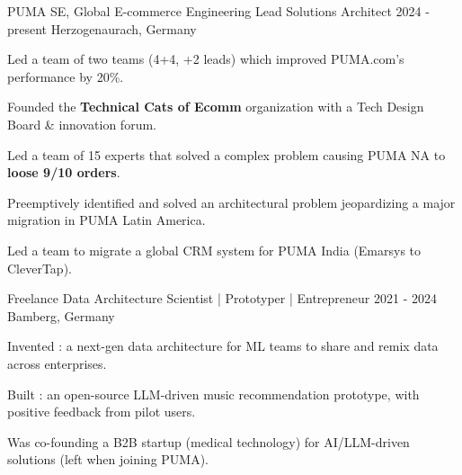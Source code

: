 {}

\vspace{2ex}

\begin{cventries}






    
        
  \cventry
    {PUMA SE, Global E-commerce Engineering}  %
    {Lead Solutions Architect} %
    {2024 - present} %
    {Herzogenaurach, Germany} %
    {
      \begin{cvitems} %
		\item {Led a team of two teams (4+4, +2 leads) which improved PUMA.com's performance by 20\%.}
		\item {Founded the \textbf{Technical Cats of Ecomm} organization with a Tech Design Board \& innovation forum.}
		\item {Led a team of 15 experts that solved a complex problem causing PUMA NA to \textbf{loose 9/10 orders}.}
		\item {Preemptively identified and solved an architectural problem jeopardizing a major migration in PUMA Latin America.}
		\item {Led a team to migrate a global CRM system for PUMA India (Emarsys to CleverTap).}
    \end{cvitems}
    }
    
\vspace{4ex}



    
        
  \cventry
    {Freelance}   %
    {Data Architecture Scientist | Prototyper | Entrepreneur} %
    {2021 - 2024} %
    {Bamberg, Germany} %
    {
      \begin{cvitems} %
		\item {Invented : a next-gen data architecture for ML teams to share and remix data across enterprises.}			
		\item {Built : an open-source LLM-driven music recommendation prototype, with positive feedback from pilot users.}
		\item {Was co-founding a B2B startup (medical technology) for AI/LLM-driven solutions (left when joining PUMA).}
    \end{cvitems}
    }
    

\end{cventries}

